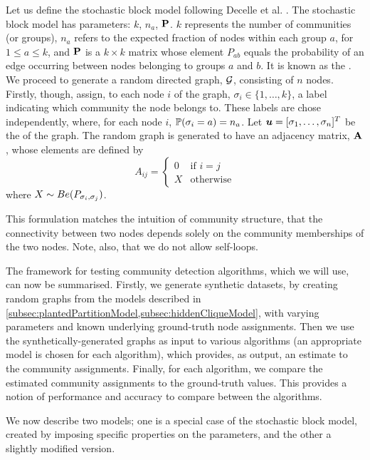 Let us define the stochastic block model following Decelle et al. \cite{DKM+13}.
The stochastic block model has parameters: $k$, $n_{a}$, $\mathbf P$. $k$ represents the number of communities (or groups), $n_{a}$ refers to the expected fraction of nodes within each group $a$, for $1 \leq a \leq k$, and $\mathbf P$ is a $k \times k$ matrix whose element $P_{ab}$ equals the probability of an edge occurring between nodes belonging to groups $a$ and $b$. It is known as the .
We proceed to generate a random directed graph, $\mathcal G$, consisting of $n$ nodes.
Firstly, though, assign, to each node $i$ of the graph, $\sigma_{i} \in \{1,\dots,k\}$, a label indicating which community the node belongs to.
These labels are chose independently, where, for each node $i$, $\mathbb{P}(\sigma_{i} = a) = n_{a}$.
Let $\vecvar{u} = \transpose{[\sigma_{1},\dots,\sigma_{n}]}$ be the  of the graph.
The random graph is generated to have an adjacency matrix, $\mathbf A$, whose elements are defined by
\begin{equation}
	\label{def:sbmAdjacencyMatrix}
	A_{ij} =
	\begin{cases}
		0 & \text{if } i = j\\
		X & \text{otherwise}
	\end{cases}
\end{equation}
where $X \sim Be(P_{\sigma_{i},\sigma_{j}})$.

This formulation matches the intuition of community structure, that the connectivity between two nodes depends solely on the community memberships of the two nodes.
Note, also, that we do not allow self-loops.

The framework for testing community detection algorithms, which we will use, can now be summarised.
Firstly, we generate synthetic datasets, by creating random graphs from the models described in \cref{subsec:plantedPartitionModel,subsec:hiddenCliqueModel}, with varying parameters and known underlying ground-truth node assignments.
Then we use the synthetically-generated graphs as input to various algorithms (an appropriate model is chosen for each algorithm), which provides, as output, an estimate to the community assignments.
Finally, for each algorithm, we compare the estimated community assignments to the ground-truth values.
This provides a notion of performance and accuracy to compare between the algorithms.

We now describe two models; one is a special case of the stochastic block model, created by imposing specific properties on the parameters, and the other a slightly modified version.

